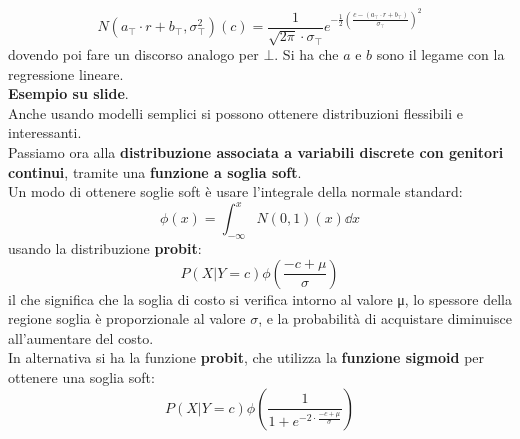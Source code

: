 \documentclass[a4paper,12pt, oneside]{book}
\begin{document}
\[N(a_\top\cdot r+b_\top, \sigma_\top^2)(c)=\frac{1}{\sqrt{2\pi}\cdot
    \sigma_\top}e^{-\frac{1}{2}\left(\frac{c-(a_\top\cdot
        r+b_\top)}{\sigma_\top}\right)^2}\]
dovendo poi fare un discorso analogo per $\bot$. Si ha che $a$ e $b$ sono il
legame con la regressione lineare.\\
\textbf{Esempio su slide}.\\
Anche usando modelli semplici si possono ottenere distribuzioni flessibili e
interessanti. \\
Passiamo ora alla \textbf{distribuzione associata a variabili discrete con
  genitori continui}, tramite una \textbf{funzione a soglia soft}. \\
Un modo di ottenere soglie soft è usare l'integrale della normale standard:
\[\phi(x)=\int_{-\infty}^x N(0,1)(x)\dd{x}\]
usando la distribuzione \textbf{probit}:
\[P(X|Y=c)\phi(\frac{-c+\mu}{\sigma})\]
il che significa che la soglia di costo si verifica intorno al valore μ, lo
spessore della regione soglia è 
proporzionale al valore $\sigma$, e la probabilità di acquistare diminuisce
all’aumentare del costo. \\
In alternativa si ha la funzione \textbf{probit}, che utilizza la
\textbf{funzione sigmoid} per ottenere una soglia soft:
\[P(X|Y=c)\phi(\frac{1}{1+e^{-2\cdot\frac{-c+\mu}{\sigma}}})\]
\end{document}
